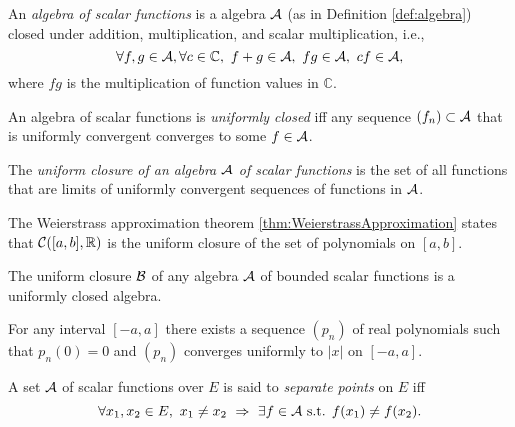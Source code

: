 \begin{defn}
  \label{def:algebraOfFuncs}
  An \emph{algebra of scalar functions} %
  is a algebra ${\cal A}$ (as in Definition \ref{def:algebra})
  closed under addition, multiplication,
  and scalar multiplication, i.e.,
  \begin{equation}
    \label{eq:algebraOfFuncs}
    \forall f,g\in {\cal A}, \forall c\in\mathbb{C},\
    f+g\in{\cal A},\ fg\in {\cal A},\ cf\in{\cal A},
  \end{equation}
  where $fg$ is the multiplication of function values in $\mathbb{C}$.
\end{defn}

\begin{defn}
  \label{def:uniformClosedness}
  An algebra of scalar functions is \emph{uniformly closed}
  iff
  any sequence $(f_n)\subset {\cal A}$
  that is uniformly convergent
  converges to some $f\in {\cal A}$.
\end{defn}

\begin{defn}
  \label{def:uniformClosure}
  The \emph{uniform closure of an algebra ${\cal A}$ of scalar functions}
  is the set of all functions that are limits
  of uniformly convergent sequences of functions in ${\cal A}$.
\end{defn}

\begin{exm}
  The Weierstrass approximation theorem \ref{thm:WeierstrassApproximation}
  states that ${\cal C}([a,b],\mathbb{R})$
  is the uniform closure of the set of polynomials on $[a,b]$.
\end{exm}

\begin{lem}
  \label{lem:uniformClosureIsClosed}
  The uniform closure ${\cal B}$ of any algebra ${\cal A}$
  of bounded scalar functions is a uniformly closed algebra. 
\end{lem}

\begin{lem}
  \label{lem:polyConvergesToAbsX}
  For any interval $[-a,a]$
  there exists a sequence $(p_n)$ of real polynomials
  such that $p_n(0)=0$ and
  $(p_n)$ converges uniformly to $|x|$ on $[-a,a]$. 
\end{lem}

\begin{defn}
  \label{def:separatePoints}
  A set ${\cal A}$ of scalar functions over $E$
  is said to \emph{separate points} on $E$
  iff
  \begin{displaymath}
    \forall x_1,x_2\in E,\
    x_1\ne x_2\ \Rightarrow\
    \exists f\in{\cal A} \text{ s.t. }
    f(x_1)\ne f(x_2).
  \end{displaymath}
\end{defn}

